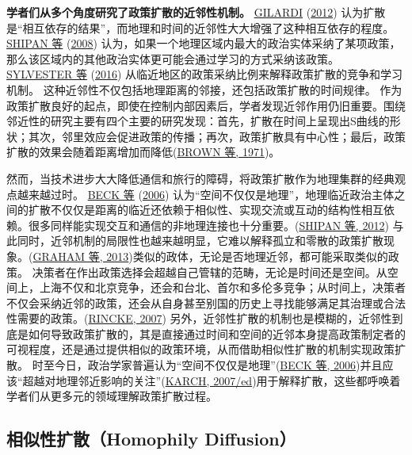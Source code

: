 \documentclass[
  12pt,
]{ctexart}
\begin{document}
\textbf{学者们从多个角度研究了政策扩散的近邻性机制。}
\protect\hyperlink{ref-Gilardi2012}{GILARDI} (\protect\hyperlink{ref-Gilardi2012}{2012}) 认为扩散是``相互依存的结果''，而地理和时间的近邻性大大增强了这种相互依存的程度。
\protect\hyperlink{ref-ShipanVolden2008}{SHIPAN 等} (\protect\hyperlink{ref-ShipanVolden2008}{2008}) 认为，如果一个地理区域内最大的政治实体采纳了某项政策，那么该区域内的其他政治实体更可能会通过学习的方式采纳该政策。
\protect\hyperlink{ref-SylvesterHaider-Markel2016}{SYLVESTER 等} (\protect\hyperlink{ref-SylvesterHaider-Markel2016}{2016}) 从临近地区的政策采纳比例来解释政策扩散的竞争和学习机制。
这种近邻性不仅包括地理距离的邻接，还包括政策扩散的时间规律。
作为政策扩散良好的起点，即使在控制内部因素后，学者发现近邻作用仍旧重要。围绕邻近性的研究主要有四个主要的研究发现：首先，扩散在时间上呈现出S曲线的形状；其次，邻里效应会促进政策的传播；再次，政策扩散具有中心性；最后，政策扩散的效果会随着距离增加而降低(\protect\hyperlink{ref-BrownCox1971}{BROWN 等, 1971})。

然而，当技术进步大大降低通信和旅行的障碍，将政策扩散作为地理集群的经典观点越来越过时。
\protect\hyperlink{ref-BeckEtAl2006}{BECK 等} (\protect\hyperlink{ref-BeckEtAl2006}{2006}) 认为``空间不仅仅是地理''，地理临近政治主体之间的扩散不仅仅是距离的临近还依赖于相似性、实现交流或互动的结构性相互依赖。很多同样能实现交互和通信的非地理连接也十分重要。(\protect\hyperlink{ref-ShipanVolden2012}{SHIPAN 等, 2012})
与此同时，近邻机制的局限性也越来越明显，它难以解释孤立和零散的政策扩散现象。(\protect\hyperlink{ref-GrahamEtAl2013}{GRAHAM 等, 2013})类似的政体，无论是否地理近邻，都可能采取类似的政策。
决策者在作出政策选择会超越自己管辖的范畴，无论是时间还是空间。从空间上，上海不仅和北京竞争，还会和台北、首尔和多伦多竞争；从时间上，决策者不仅会采纳近邻的政策，还会从自身甚至别国的历史上寻找能够满足其治理或合法性需要的政策。(\protect\hyperlink{ref-Rincke2007}{RINCKE, 2007})
另外，近邻性扩散的机制也是模糊的，近邻性到底是如何导致政策扩散的，其是直接通过时间和空间的近邻本身提高政策制定者的可视程度，还是通过提供相似的政策环境，从而借助相似性扩散的机制实现政策扩散。
时至今日，政治学家普遍认为``空间不仅仅是地理''(\protect\hyperlink{ref-BeckEtAl2006}{BECK 等, 2006})并且应该``超越对地理邻近影响的关注''(\protect\hyperlink{ref-Karch2007a}{KARCH, 2007/ed})用于解释扩散，这些都呼唤着学者们从更多元的领域理解政策扩散过程。

\hypertarget{ux76f8ux4f3cux6027ux6269ux6563homophily-diffusion}{%
\subsection{相似性扩散（Homophily Diffusion）}\label{ux76f8ux4f3cux6027ux6269ux6563homophily-diffusion}}
\end{document}
